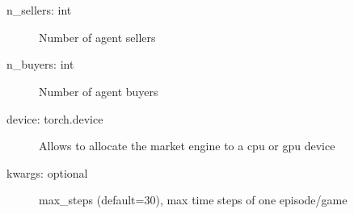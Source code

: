 \documentclass[letterpaper,10pt,english]{sphinxmanual}
\begin{document}
\begin{fulllineitems}
\label{\detokenize{MultiAgentMarketRL:markets.BaseMarketEngine}}~

\begin{fulllineitems}
\label{\detokenize{MultiAgentMarketRL:markets.BaseMarketEngine.__init__}}~\begin{description}
\item[{n\_sellers: int}] \leavevmode
\sphinxAtStartPar
Number of agent sellers

\item[{n\_buyers: int}] \leavevmode
\sphinxAtStartPar
Number of agent buyers

\item[{device: torch.device}] \leavevmode
\sphinxAtStartPar
Allows to allocate the market engine to a cpu or gpu device

\item[{kwargs: optional}] \leavevmode
\sphinxAtStartPar
max\_steps (default=30), max time steps of one episode/game

\end{description}

\end{fulllineitems}


\begin{fulllineitems}
\label{\detokenize{MultiAgentMarketRL:markets.BaseMarketEngine.calculate_deals}}
\end{fulllineitems}


\end{fulllineitems}
\end{document}
